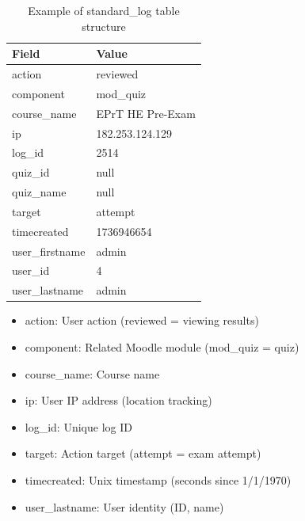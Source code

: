 \begin{table}[H]
	\centering
	\caption{Example of standard\_log table structure}
	\label{tab:json_log_example}
	\begin{tabular}{|l|l|}
		\hline
		\textbf{Field} & \textbf{Value} \\ \hline
		action & reviewed \\ \hline
		component & mod\_quiz \\ \hline
		course\_name & EPrT HE Pre-Exam \\ \hline
		ip & 182.253.124.129 \\ \hline
		log\_id & 2514 \\ \hline
		quiz\_id & null \\ \hline
		quiz\_name & null \\ \hline
		target & attempt \\ \hline
		timecreated & 1736946654 \\ \hline
		user\_firstname & admin \\ \hline
		user\_id & 4 \\ \hline
		user\_lastname & admin \\ \hline
	\end{tabular}
\end{table}

\begin{itemize}
	\item action: User action (reviewed = viewing results)
	\item component: Related Moodle module (mod\_quiz = quiz)
	\item course\_name: Course name
	\item ip: User IP address (location tracking)
	\item log\_id: Unique log ID
	\item target: Action target (attempt = exam attempt)
	\item timecreated: Unix timestamp (seconds since 1/1/1970)
	\item user\_lastname: User identity (ID, name)
\end{itemize}

